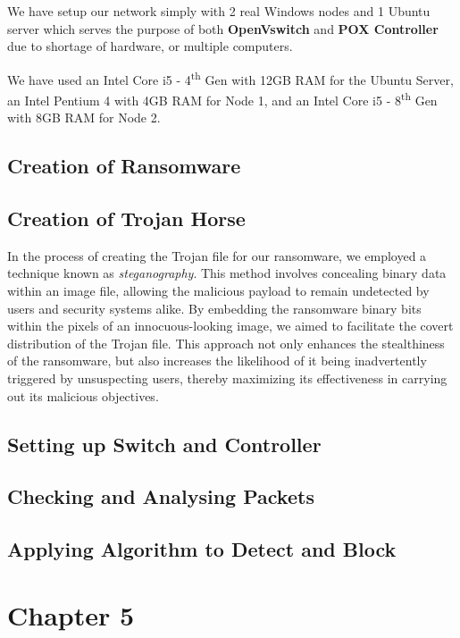 \documentclass[12pt,letterpaper]{article}
\begin{document}
        We have setup our network simply with 2 real Windows nodes and 1 Ubuntu server which serves the purpose of both \textbf{OpenVswitch} and \textbf{POX Controller} due to shortage of hardware, or multiple computers.

       We have used an Intel Core i5 - 4\textsuperscript{th} Gen with 12GB RAM for the Ubuntu Server, an Intel Pentium 4 with 4GB RAM for Node 1, and an Intel Core i5 - 8\textsuperscript{th} Gen with 8GB RAM for Node 2.


        \subsection{Creation of Ransomware}

        \subsection{Creation of Trojan Horse}

        In the process of creating the Trojan file for our ransomware, we employed a technique known as \textit{steganography}. This method involves concealing binary data within an image file, allowing the malicious payload to remain undetected by users and security systems alike. By embedding the ransomware binary bits within the pixels of an innocuous-looking image, we aimed to facilitate the covert distribution of the Trojan file. This approach not only enhances the stealthiness of the ransomware, but also increases the likelihood of it being inadvertently triggered by unsuspecting users, thereby maximizing its effectiveness in carrying out its malicious objectives.

        \subsection{Setting up Switch and Controller}

        \subsection{Checking and Analysing Packets}

        \subsection{Applying Algorithm to Detect and Block}
        
\clearpage
    \newpage
    \section*{Chapter 5}
\end{document}
